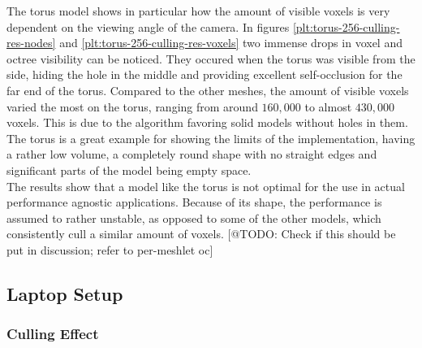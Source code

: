 


\noindent
The torus model shows in particular how the amount of visible voxels is very dependent on the 
viewing angle of the camera. In figures \ref{plt:torus-256-culling-res-nodes} and 
\ref{plt:torus-256-culling-res-voxels} two immense drops in voxel and octree visibility can be noticed.
They occured when the torus was visible from the side, hiding the hole in the middle and providing excellent 
self-occlusion for the far end of the torus. Compared to the other meshes, the amount of visible voxels 
varied the most on the torus, ranging from around $160,000$ to almost $430,000$ voxels. This is due to the 
algorithm favoring solid models without holes in them. The torus is a great example for showing the limits of 
the implementation, having a rather low volume, a completely round shape with no straight edges and significant 
parts of the model being empty space. \\

\noindent
The results show that a model like the torus is not optimal for the use in actual performance agnostic applications.
Because of its shape, the performance is assumed to rather unstable, as opposed to some of the other models, which 
consistently cull a similar amount of voxels. [@TODO: Check if this should be put in discussion; refer to per-meshlet
oc]




\subsection*{Laptop Setup}


\subsubsection*{Culling Effect}




















